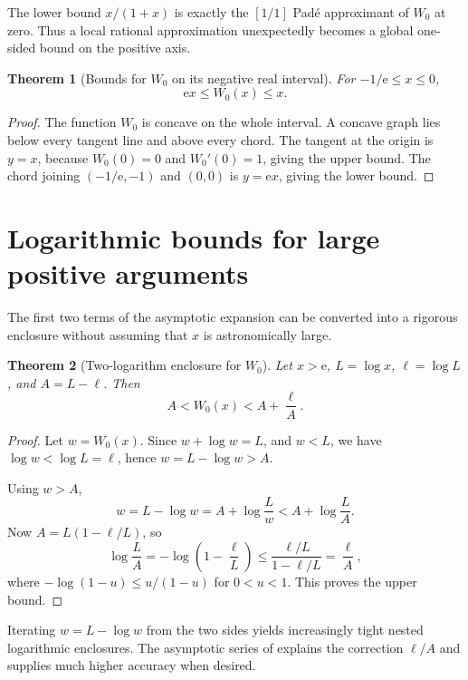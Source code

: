 \documentclass[11pt,openany]{book}
\newcommand{\e}{\mathrm{e}}
\theoremstyle{plain}
\newtheorem{theorem}{Theorem}[chapter]
\theoremstyle{definition}
\theoremstyle{remark}
\begin{document}
The lower bound \(x/(1+x)\) is exactly the \([1/1]\) Pad\'{e} approximant of
\(W_0\) at zero.  Thus a local rational approximation unexpectedly becomes a
global one-sided bound on the positive axis.

\begin{theorem}[Bounds for \(W_0\) on its negative real interval]
For \(-1/\e\le x\le0\),
\begin{equation}\label{eq:w0negativebounds}
             \e x\le W_0(x)\le x.
\end{equation}
\end{theorem}

\begin{proof}
The function \(W_0\) is concave on the whole interval.  A concave graph lies
below every tangent line and above every chord.  The tangent at the origin is
\(y=x\), because \(W_0(0)=0\) and \(W_0'(0)=1\), giving the upper bound.
The chord joining \((-1/\e,-1)\) and \((0,0)\) is \(y=\e x\), giving the
lower bound.
\end{proof}

\section{Logarithmic bounds for large positive arguments}
The first two terms of the asymptotic expansion can be converted into a
rigorous enclosure without assuming that \(x\) is astronomically large.

\begin{theorem}[Two-logarithm enclosure for \(W_0\)]\label{thm:w0logbounds}
Let \(x>\e\), \(L=\log x\), \(\ell=\log L\), and
\(A=L-\ell\).  Then
\begin{equation}\label{eq:w0logbounds}
       A<W_0(x)<A+\frac{\ell}{A}.
\end{equation}
\end{theorem}

\begin{proof}
Let \(w=W_0(x)\).  Since \(w+\log w=L\), and \(w<L\), we have
\(\log w<\log L=\ell\), hence \(w=L-\log w>A\).

Using \(w>A\),
\[
 w=L-\log w
   =A+\log\frac{L}{w}
   <A+\log\frac{L}{A}.
\]
Now \(A=L(1-\ell/L)\), so
\[
 \log\frac{L}{A}=-\log\left(1-\frac\ell L\right)
 \le\frac{\ell/L}{1-\ell/L}=\frac\ell A,
\]
where \(-\log(1-u)\le u/(1-u)\) for \(0<u<1\).  This proves the upper
bound.
\end{proof}

Iterating \(w=L-\log w\) from the two sides yields increasingly tight nested
logarithmic enclosures.  The asymptotic series of  explains
the correction \(\ell/A\) and supplies much higher accuracy when desired.
\end{document}
